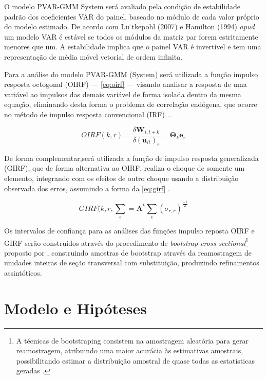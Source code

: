 \documentclass[
  12pt,
  12pt,
  openright,
  oneside,
  a4paper,
  chapter=TITLE,
  section=TITLE,
  subsection=TITLE,
  subsubsection=TITLE,
  english,
  portugues,
  sumario=tradicional]{abntex2}
\begin{document}
O modelo PVAR-GMM System será avaliado pela condição de estabilidade padrão dos coeficientes VAR do painel, baseado no módulo de cada valor próprio do modelo estimado. De acordo com Lu ̈tkepohl (2007) e Hamilton (1994) \emph{apud} \textcite{sigmund:2008} um modelo VAR é estável se todos os módulos da matriz par forem estritamente menores que um. A estabilidade implica que o painel VAR é invertível e tem uma representação de média móvel vetorial de ordem infinita.

Para a análise do modelo PVAR-GMM (System) será utilizada a função impulso resposta octogonal (OIRF) --- \autoref{eq:oirf} --- visando analisar a resposta de uma variável ao impulsos das demais variável de forma isolada dentro da mesma equação, eliminando desta forma o problema de correlação endógena, que ocorre no método de impulso resposta convencional (IRF) \cite{sigmund:2008}..

\begin{equation}\label{eq:oirf}
OIRF(k,r) = \frac{\delta\mathbf{W}_{i,t+k}}{\delta(\mathbf{u}_{it})_{r}} = \mathbf{\Theta}_{k}\mathbf{e}_{r}  
\end{equation}

De forma complementar,será utilizada a função de impulso resposta generalizada (GIRF), que de forma alternativa ao OIRF, realiza o choque de somente um elemento, integrando com os efeitos de outro choque usando a distribuição observada dos erros, assumindo a forma da \autoref{eq:girf} \cite{sigmund:2008}.

\begin{equation}\label{eq:girf}
GIRF(k,r,\sum_{\epsilon} = \mathbf{A}^k\sum_{\epsilon}(\sigma_{r,r})^\frac{-1}{2} 
\end{equation}

Os intervalos de confiança para as análises das funções impulso reposta OIRF e GIRF serão construídos através do procedimento de \emph{bootstrap cross-sectional}\footnote{A técnicas de bootstraping consistem na amostragem aleatória para gerar reamostragem, atribuindo uma maior acurácia às estimativas amostrais, possibilitando estimar a distribuição amostral de quase todas as estatísticas geradas \cite{sigmund:2008}.} proposto por \textcite{kapetanios:2008}, construindo amostras de bootstrap através da reamostragem de unidades inteiras de seção transversal com substituição, produzindo refinamentos assintóticos.

\section{Modelo e Hipóteses}
\end{document}
